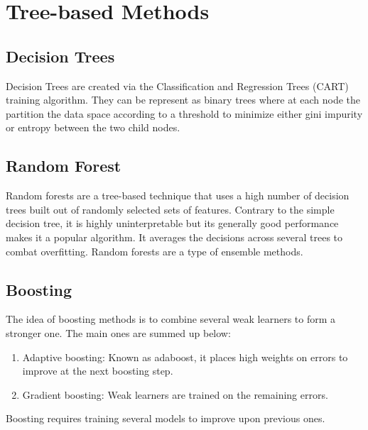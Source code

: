 \section{Tree-based Methods}
\subsection{Decision Trees}
Decision Trees are created via the Classification and Regression Trees (CART)
training algorithm. They can be represent as binary trees where at each node the
partition the data space according to a threshold to minimize either gini impurity
or entropy between the two child nodes.
\subsection{Random Forest}
Random forests are a tree-based technique that uses a high number of decision
trees built out of randomly selected sets of features. Contrary to the simple
decision tree, it is highly uninterpretable but its generally good performance
makes it a popular algorithm. It averages the decisions across several trees
to combat overfitting. Random forests are a type of ensemble methods.
\subsection{Boosting}
The idea of boosting methods is to combine several weak learners to form a
stronger one. The main ones are summed up below:
\begin{enumerate}
  \item Adaptive boosting: Known as adaboost, it places high weights on errors
    to improve at the next boosting step.
  \item Gradient boosting: Weak learners are trained on the remaining errors.
\end{enumerate}
Boosting requires training several models to improve upon previous ones.
